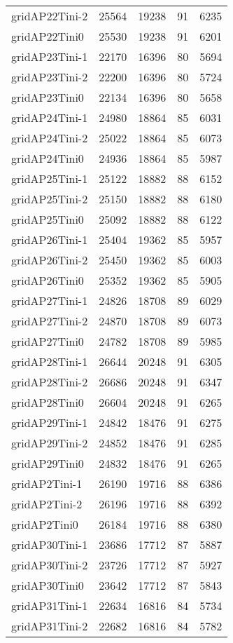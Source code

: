 \begin{longtable}{lrrrr}
gridAP22Tini-2 & 25564 & 19238 & 91 & 6235 \\
gridAP22Tini0 & 25530 & 19238 & 91 & 6201 \\
gridAP23Tini-1 & 22170 & 16396 & 80 & 5694 \\
gridAP23Tini-2 & 22200 & 16396 & 80 & 5724 \\
gridAP23Tini0 & 22134 & 16396 & 80 & 5658 \\
gridAP24Tini-1 & 24980 & 18864 & 85 & 6031 \\
gridAP24Tini-2 & 25022 & 18864 & 85 & 6073 \\
gridAP24Tini0 & 24936 & 18864 & 85 & 5987 \\
gridAP25Tini-1 & 25122 & 18882 & 88 & 6152 \\
gridAP25Tini-2 & 25150 & 18882 & 88 & 6180 \\
gridAP25Tini0 & 25092 & 18882 & 88 & 6122 \\
gridAP26Tini-1 & 25404 & 19362 & 85 & 5957 \\
gridAP26Tini-2 & 25450 & 19362 & 85 & 6003 \\
gridAP26Tini0 & 25352 & 19362 & 85 & 5905 \\
gridAP27Tini-1 & 24826 & 18708 & 89 & 6029 \\
gridAP27Tini-2 & 24870 & 18708 & 89 & 6073 \\
gridAP27Tini0 & 24782 & 18708 & 89 & 5985 \\
gridAP28Tini-1 & 26644 & 20248 & 91 & 6305 \\
gridAP28Tini-2 & 26686 & 20248 & 91 & 6347 \\
gridAP28Tini0 & 26604 & 20248 & 91 & 6265 \\
gridAP29Tini-1 & 24842 & 18476 & 91 & 6275 \\
gridAP29Tini-2 & 24852 & 18476 & 91 & 6285 \\
gridAP29Tini0 & 24832 & 18476 & 91 & 6265 \\
gridAP2Tini-1 & 26190 & 19716 & 88 & 6386 \\
gridAP2Tini-2 & 26196 & 19716 & 88 & 6392 \\
gridAP2Tini0 & 26184 & 19716 & 88 & 6380 \\
gridAP30Tini-1 & 23686 & 17712 & 87 & 5887 \\
gridAP30Tini-2 & 23726 & 17712 & 87 & 5927 \\
gridAP30Tini0 & 23642 & 17712 & 87 & 5843 \\
gridAP31Tini-1 & 22634 & 16816 & 84 & 5734 \\
gridAP31Tini-2 & 22682 & 16816 & 84 & 5782 \\

\end{longtable}
